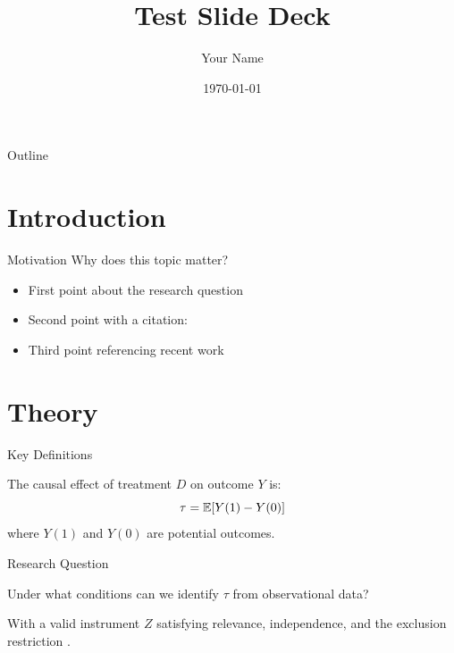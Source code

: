 \documentclass[9pt,english,aspectratio=169]{beamer}
\title{Test Slide Deck}
\author{Your Name}
\date{\today}
\begin{document}
\begin{frame}
  \titlepage
\end{frame}

\begin{frame}{Outline}
  \tableofcontents
\end{frame}

\section{Introduction}

\begin{frame}{Motivation}
  Why does this topic matter?
  \begin{itemize}
    \item First point about the research question
    \item Second point with a citation: 
    \item Third point referencing recent work 
  \end{itemize}
\end{frame}

\section{Theory}

\begin{frame}{Key Definitions}
  \begin{definitionbox}
    The causal effect of treatment $D$ on outcome $Y$ is:
    \[
      \tau = \mathbb{E}[Y(1) - Y(0)]
    \]
    where $Y(1)$ and $Y(0)$ are potential outcomes.
  \end{definitionbox}
\end{frame}

\begin{frame}{Research Question}
  \begin{questionbox}
    Under what conditions can we identify $\tau$ from observational data?
  \end{questionbox}

  \vspace{1em}

  \begin{answerbox}
    With a valid instrument $Z$ satisfying relevance, independence, and the exclusion restriction .
  \end{answerbox}
\end{frame}
\end{document}
